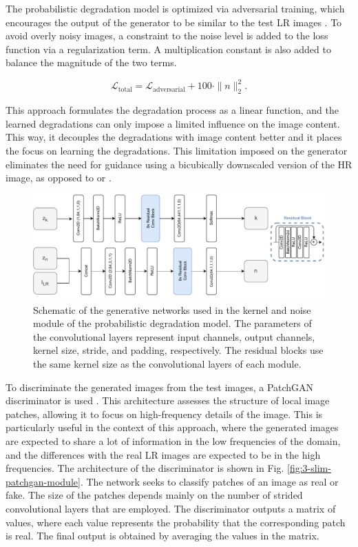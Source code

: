     The probabilistic degradation model is optimized via adversarial training, which encourages the output of the generator to be similar to the test LR images \cite{bulat2018learn}.
    To avoid overly noisy images, a constraint to the noise level is added to the loss function via a regularization term. 
    A multiplication constant is also added to balance the magnitude of the two terms.

    \begin{equation}
        \mathcal{L}_{\text{total}} = \mathcal{L}_{\text{adversarial}} + 100 \cdot \|n\|_2^2.
    \end{equation}

    This approach formulates the degradation process as a linear function, and the learned degradations can only impose a limited influence on the image content.
    This way, it decouples the degradations with image content better and it places the focus on learning the degradations.
    This limitation imposed on the generator eliminates the need for guidance using a bicubically downscaled version of the HR image, as opposed to \cite{wei2020unsupervised} or \cite{bulat2018learn}.

    \begin{figure}[H]
        \centering
        \includegraphics[width=\textwidth]{Includes/3-slim-gen-module.pdf}
        \caption{Schematic of the generative networks used in the kernel and noise module of the probabilistic degradation model.
        The parameters of the convolutional layers represent input channels, output channels, kernel size, stride, and padding, respectively.
        The residual blocks use the same kernel size as the convolutional layers of each module.}
        \label{fig:3-slim-gen-module}
    \end{figure}

    To discriminate the generated images from the test images, a PatchGAN discriminator is used \cite{isola2018imagetoimage}. This architecture assesses the structure of local image patches, allowing it to focus on high-frequency details of the image. This is particularly useful in the context of this approach, where the generated images are expected to share a lot of information in the low frequencies of the domain, and the differences with the real LR images are expected to be in the high frequencies. The architecture of the discriminator is shown in Fig. \ref{fig:3-slim-patchgan-module}.
    The network seeks to classify patches of an image as real or fake. The size of the patches depends mainly on the number of strided convolutional layers that are employed. The discriminator outputs a matrix of values, where each value represents the probability that the corresponding patch is real. The final output is obtained by averaging the values in the matrix.

